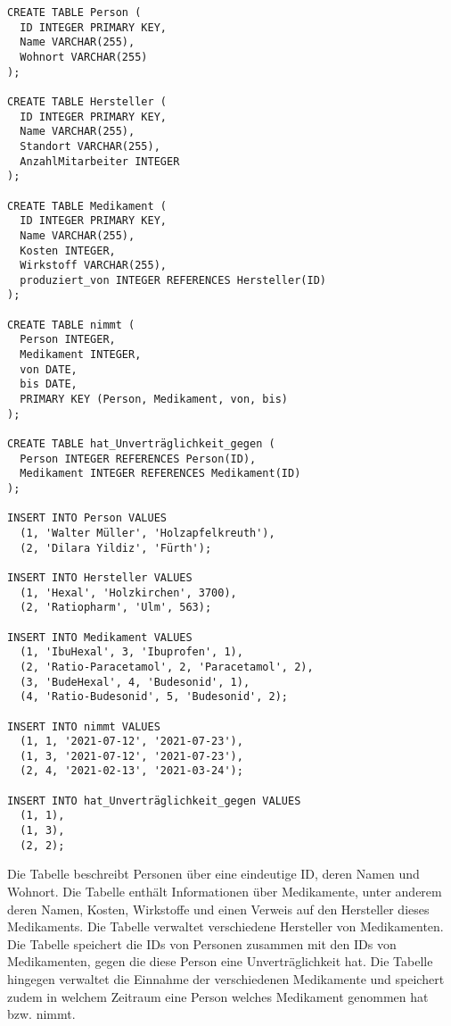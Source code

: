 \documentclass{lehramt-informatik-aufgabe}
\begin{document}
\begin{verbatim}
CREATE TABLE Person (
  ID INTEGER PRIMARY KEY,
  Name VARCHAR(255),
  Wohnort VARCHAR(255)
);

CREATE TABLE Hersteller (
  ID INTEGER PRIMARY KEY,
  Name VARCHAR(255),
  Standort VARCHAR(255),
  AnzahlMitarbeiter INTEGER
);

CREATE TABLE Medikament (
  ID INTEGER PRIMARY KEY,
  Name VARCHAR(255),
  Kosten INTEGER,
  Wirkstoff VARCHAR(255),
  produziert_von INTEGER REFERENCES Hersteller(ID)
);

CREATE TABLE nimmt (
  Person INTEGER,
  Medikament INTEGER,
  von DATE,
  bis DATE,
  PRIMARY KEY (Person, Medikament, von, bis)
);

CREATE TABLE hat_Unverträglichkeit_gegen (
  Person INTEGER REFERENCES Person(ID),
  Medikament INTEGER REFERENCES Medikament(ID)
);

INSERT INTO Person VALUES
  (1, 'Walter Müller', 'Holzapfelkreuth'),
  (2, 'Dilara Yildiz', 'Fürth');

INSERT INTO Hersteller VALUES
  (1, 'Hexal', 'Holzkirchen', 3700),
  (2, 'Ratiopharm', 'Ulm', 563);

INSERT INTO Medikament VALUES
  (1, 'IbuHexal', 3, 'Ibuprofen', 1),
  (2, 'Ratio-Paracetamol', 2, 'Paracetamol', 2),
  (3, 'BudeHexal', 4, 'Budesonid', 1),
  (4, 'Ratio-Budesonid', 5, 'Budesonid', 2);

INSERT INTO nimmt VALUES
  (1, 1, '2021-07-12', '2021-07-23'),
  (1, 3, '2021-07-12', '2021-07-23'),
  (2, 4, '2021-02-13', '2021-03-24');

INSERT INTO hat_Unverträglichkeit_gegen VALUES
  (1, 1),
  (1, 3),
  (2, 2);
\end{verbatim}

Die Tabelle  beschreibt Personen über eine eindeutige ID,
deren Namen und Wohnort. Die Tabelle  enthält
Informationen über Medikamente, unter anderem deren Namen, Kosten,
Wirkstoffe und einen Verweis auf den Hersteller dieses Medikaments. Die
Tabelle  verwaltet verschiedene Hersteller von
Medikamenten. Die Tabelle  speichert
die IDs von Personen zusammen mit den IDs von Medikamenten, gegen die
diese Person eine Unverträglichkeit hat. Die Tabelle  hingegen
verwaltet die Einnahme der verschiedenen Medikamente und speichert zudem
in welchem Zeitraum eine Person welches Medikament genommen hat bzw.
nimmt.
\end{document}
